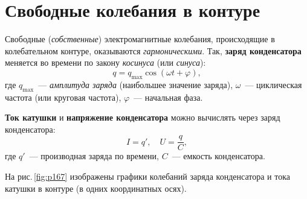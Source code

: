 \documentclass[main.tex]{subfiles}
\begin{document}

 

 

 
   

\section{Свободные колебания в контуре}


Свободные (\emph{собственные}) электромагнитные колебания, происходящие в колебательном контуре, оказываются \emph{гармоническими}. Так, \textbf{заряд конденсатора} меняется во времени по закону \emph{косинуса} (или \emph{синуса}):
\begin{equation}
    q=q_\text{max}\cos(\omega t + \varphi),
\end{equation}
где $q_\text{max}$~--- \emph{амплитуда заряда} (наибольшее значение заряда), $\omega$~--- циклическая частота (или круговая частота),
$\varphi$~--- начальная фаза.

\textbf{Ток катушки} и \textbf{напряжение конденсатора} можно вычислять через заряд конденсатора:
\begin{equation}
    I=q',\quad U=\frac{q}{C},
\end{equation}
где $q'$~--- производная заряда по времени, $C$~--- емкость конденсатора.

На рис.\,\ref{fig:p167} изображены графики колебаний заряда конденсатора и тока катушки в контуре (в одних координатных осях).
\end{document}
